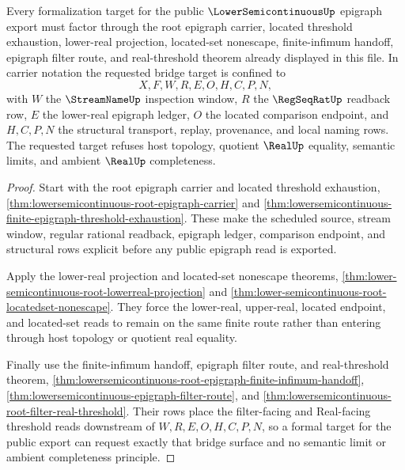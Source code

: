 \begin{theorem}
\label{thm:lowersemicontinuous-formal-target-bridge-request}
Every formalization target for the public $\LowerSemicontinuousUp$ epigraph export must factor through the root epigraph carrier, located threshold exhaustion, lower-real projection, located-set nonescape, finite-infimum handoff, epigraph filter route, and real-threshold theorem already displayed in this file. In carrier notation the requested bridge target is confined to
$$
X,F,W,R,E,O,H,C,P,N ,
$$
with $W$ the $\StreamNameUp$ inspection window, $R$ the $\RegSeqRatUp$ readback row, $E$ the lower-real epigraph ledger, $O$ the located comparison endpoint, and $H,C,P,N$ the structural transport, replay, provenance, and local naming rows. The requested target refuses host topology, quotient $\RealUp$ equality, semantic limits, and ambient $\RealUp$ completeness.
\end{theorem}
\begin{proof}
Start with the root epigraph carrier and located threshold exhaustion, \autoref{thm:lowersemicontinuous-root-epigraph-carrier} and \autoref{thm:lowersemicontinuous-finite-epigraph-threshold-exhaustion}. These make the scheduled source, stream window, regular rational readback, epigraph ledger, comparison endpoint, and structural rows explicit before any public epigraph read is exported.

Apply the lower-real projection and located-set nonescape theorems, \autoref{thm:lower-semicontinuous-root-lowerreal-projection} and \autoref{thm:lower-semicontinuous-root-locatedset-nonescape}. They force the lower-real, upper-real, located endpoint, and located-set reads to remain on the same finite route rather than entering through host topology or quotient real equality.

Finally use the finite-infimum handoff, epigraph filter route, and real-threshold theorem, \autoref{thm:lowersemicontinuous-root-epigraph-finite-infimum-handoff}, \autoref{thm:lowersemicontinuous-epigraph-filter-route}, and \autoref{thm:lowersemicontinuous-root-filter-real-threshold}. Their rows place the filter-facing and Real-facing threshold reads downstream of $W,R,E,O,H,C,P,N$, so a formal target for the public export can request exactly that bridge surface and no semantic limit or ambient completeness principle.
\end{proof}
